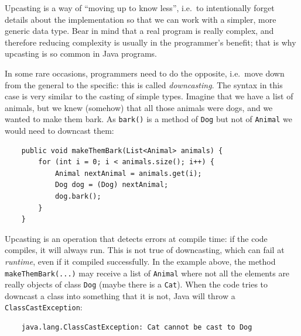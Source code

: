 Upcasting is a way of ``moving up to know less'', i.e.~to
intentionally forget details about the implementation so that we can
work with a simpler, more generic data type. 
Bear in mind that a real program is really complex, and therefore
reducing complexity is usually in the programmer's benefit; that
is why upcasting is so common in Java programs. 

In some rare occasions,
programmers need to do the opposite, i.e.~move down from the general
to the specific: this is called \emph{downcasting}. The syntax in this
case is very similar to the casting of simple types. Imagine that we
have a list of animals, but we knew (somehow) that all those animals
were dogs, and we wanted to make them bark. As \verb+bark()+ is a
method of \verb+Dog+ but not of \verb+Animal+ we would need to
downcast them: 

\begin{verbatim}
    public void makeThemBark(List<Animal> animals) {
        for (int i = 0; i < animals.size(); i++) {
            Animal nextAnimal = animals.get(i);
            Dog dog = (Dog) nextAnimal;
            dog.bark();
        }
    }
\end{verbatim}

Upcasting is an operation that detects errors at compile time: if the
code compiles, it will always run. This is not true of downcasting, which can
fail at \emph{runtime}, even if it compiled successfully. In the
example above, the method \verb+makeThemBark(...)+ may receive a list
of \verb+Animal+ where not all the elements are really objects of
class \verb+Dog+ (maybe there is a \verb+Cat+). When the code tries to
downcast a class into something that it is not, Java will throw a
\verb+ClassCastException+: 

\begin{verbatim}
    java.lang.ClassCastException: Cat cannot be cast to Dog
\end{verbatim}



